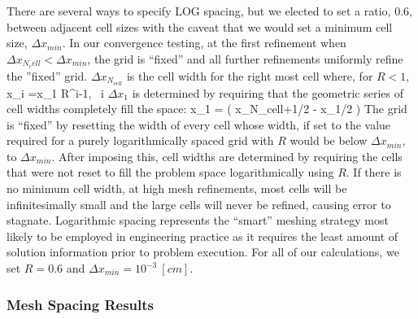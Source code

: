 There are several ways to specify LOG spacing, but we elected to set a ratio, $0.6$, between adjacent cell sizes with the caveat that we would set a minimum cell size, $\Delta x_{min}$.
In our convergence testing, at the first refinement when $\Delta x_{N_cell} < \Delta x_{min}$, the grid is ``fixed'' and all further refinements uniformly refine the ''fixed'' grid.  $\Delta x_{N_{cell}}$ is the cell width for the right most cell where, for $R < 1$,
\benum
\Delta x_i =\Delta x_1 R^{i-1}, ~i\in[1,N_{cell}] \pep
\eenum
$\Delta x_1$ is determined by requiring that the geometric series of cell widths completely fill the space:
\benum
\Delta x_1 = \left( x_{N_{cell}+1/2} - x_{1/2} \right) 
\eenum
The grid is ``fixed'' by resetting the width of every cell whose width, if set to the value required for a purely logarithmically spaced grid with $R$ would be below  $\Delta x_{min}$, to $\Delta x_{min}$. 
After imposing this, cell widths are determined by requiring the cells that were not reset to fill the problem space logarithmically using $R$.
If there is no minimum cell width, at high mesh refinements, most cells will be infinitesimally small and the large cells will never be refined, causing error to stagnate. 
Logarithmic spacing represents the ``smart'' meshing strategy most likely to be employed in engineering practice as it requires the least amount of solution information prior to problem execution.  
For all of our calculations, we set $R=0.6$ and $\Delta x_{min} = 10^{-3}~[cm]$.

\subsubsection{Mesh Spacing Results}
\label{sec:mesh_results}

